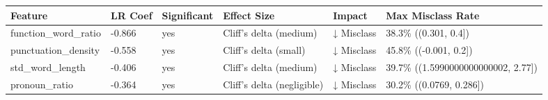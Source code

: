 \begin{tabular}{llllll}
\toprule
Feature & LR Coef & Significant & Effect Size & Impact & Max Misclass Rate \\
\midrule
function\_word\_ratio & -0.866 & yes & Cliff's delta (medium) & ↓ Misclass & 38.3\% ((0.301, 0.4]) \\
punctuation\_density & -0.558 & yes & Cliff's delta (small) & ↓ Misclass & 45.8\% ((-0.001, 0.2]) \\
std\_word\_length & -0.406 & yes & Cliff's delta (medium) & ↓ Misclass & 39.7\% ((1.5990000000000002, 2.77]) \\
pronoun\_ratio & -0.364 & yes & Cliff's delta (negligible) & ↓ Misclass & 30.2\% ((0.0769, 0.286]) \\
\bottomrule
\end{tabular}

